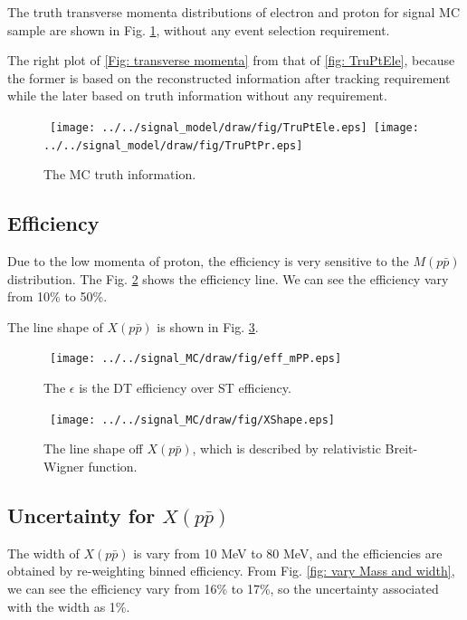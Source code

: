 The truth transverse momenta distributions of electron and proton for
signal MC sample are shown in Fig. \ref{fig: TruPtEle}, without any
event selection requirement.

The right plot of \ref{Fig: transverse momenta} from that of \ref{fig:
TruPtEle}, because the former is based on the reconstructed information
after tracking requirement while the later based on truth information
without any requirement.


\begin{figure}[htbp] %
    \begin{center}
    \mbox{
        \texttt{[image: ../../signal\_model/draw/fig/TruPtEle.eps]}
        \texttt{[image: ../../signal\_model/draw/fig/TruPtPr.eps]}
    }
    \end{center}
    \caption{The MC truth information.}
    \label{fig: TruPtEle}
\end{figure}

\subsection*{Efficiency}
Due to the low momenta of proton, the efficiency is very sensitive to
the $M(p\bar{p})$ distribution. The Fig. \ref{fig: eff_mpp} shows the
efficiency line. We can see the efficiency vary from 10\% to 50\%.

The line shape of $X(p\bar{p})$ is shown in Fig. \ref{fig: XShape}.
\begin{figure}[htbp]
    \begin{center}
    \mbox{
        \texttt{[image: ../../signal\_MC/draw/fig/eff\_mPP.eps]}
    }
    \end{center}
    \caption{The $\epsilon$ is the DT efficiency over ST efficiency.}
    \label{fig: eff_mpp}
\end{figure}

\begin{figure}[htbp]
    \begin{center}
    \mbox{
        \texttt{[image: ../../signal\_MC/draw/fig/XShape.eps]}
    }
    \end{center}
    \caption{The line shape off $X(p\bar{p})$, which is described by
    relativistic Breit-Wigner function.}
    \label{fig: XShape}
\end{figure}

\subsection{Uncertainty for $X(p\bar{p})$}
\label{uncertainties for Xpp}
The width of $X(p\bar{p})$ is vary from 10 MeV to 80 MeV, and
the efficiencies are obtained by re-weighting binned efficiency.
From Fig. \ref{fig: vary Mass and width}, we can see the efficiency
vary from 16\% to 17\%, 
so the uncertainty associated with the width as 1\%.

